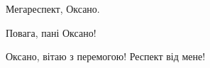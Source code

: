 \begin{itemize}
Мегареспект, Оксано.

 
Повага, пані Оксано!

 
Оксано, вітаю з перемогою! Респект від мене!

\end{itemize}

